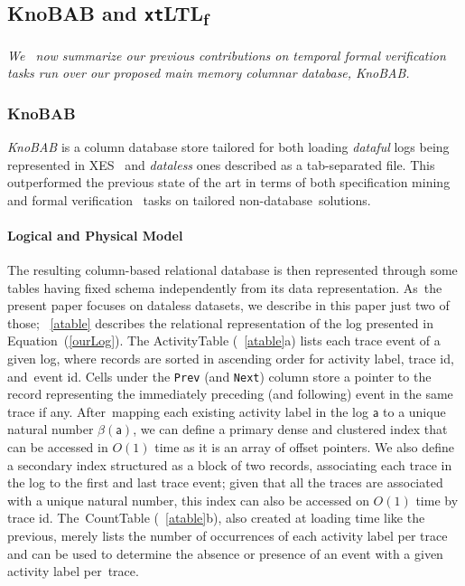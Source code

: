\documentclass[information,article,accept,pdftex,oneauthor]{Definitions/mdpi}
\newcommand{\const}[1]{\ensuremath{\mathsf{#1}}}
\begin{document}
\subsection{KnoBAB and \texttt{xt}LTL\textsubscript{f}}
\textit{{We}%
~now summarize our previous contributions on temporal formal verification tasks run over our proposed main memory columnar database, KnoBAB.}

\subsubsection{KnoBAB}\label{knobab}
\textit{KnoBAB} \cite{info14030173,computers12090185} is a column database store tailored for both loading \textit{dataful} logs being represented in XES~\cite{DBLP:journals/cim/AcamporaVSAGV17} and \textit{dataless} ones described as a tab-separated file. This outperformed the previous state of the art in terms of both specification mining~\cite{APrioriDeclare} and formal verification~\cite{BurattinMS16} tasks on tailored non-database~solutions.  

\paragraph{Logical and Physical Model} 

The resulting column-based relational database is then represented through some tables having fixed schema independently from its data representation. As~the present paper focuses on dataless datasets, we describe in this paper just two of those; \tablename~\ref{atable} describes the relational representation of the log presented in Equation~(\ref{ourLog}). 
The ActivityTable (\tablename~\ref{atable}a) lists each trace event of a given log, where records are sorted in ascending order for activity label, trace id, and~event id. Cells under the  \texttt{Prev} (and \texttt{Next}) column store a pointer to the record representing the immediately preceding (and following) event in the same trace if any. After~mapping each existing activity label in the log $\const{a}$ to a unique natural number $\beta(\const{a})$, we can define a primary dense and clustered index  that can be accessed in $O(1)$ time as it is an array of offset pointers. We also define a secondary index structured as a block of two records, associating each trace in the log to the  first and last trace event; given that all the traces are associated with a unique natural number, this index can also be accessed on $O(1)$ time by trace id. The~CountTable (\tablename~\ref{atable}b), also created at loading time like the previous, merely lists the number of occurrences of each activity label per trace and can be used to determine the absence or presence of an event with a given activity label per~trace.
\end{document}
